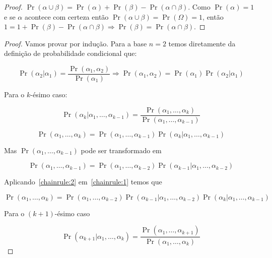 \documentclass{amsart}
\theoremstyle{plain}
\numberwithin{equation}{subsection}
\renewcommand{\implies}{\Rightarrow}
\begin{document}
\superset*
\begin{proof}
  $\Pr(\alpha\cup\beta)=\Pr(\alpha)+\Pr(\beta)-\Pr(\alpha\cap\beta)$. Como $\Pr(\alpha)=1$ e se
  $\alpha$ acontece com certeza então $\Pr(\alpha\cup\beta)=\Pr(\Omega)=1$, então $1=1+\Pr(\beta)-
  \Pr(\alpha\cap\beta)\implies\Pr(\beta)=\Pr(\alpha\cap\beta)$.
\end{proof}

\chainrule*
\begin{proof}
  Vamos provar por indução. Para a base $n=2$ temos diretamente da definição de probabilidade
  condicional que:

  \begin{equation*}
    \Pr(\alpha_2|\alpha_1)=\frac{\Pr(\alpha_1,\alpha_2)}{\Pr(\alpha_1)}\Rightarrow\Pr(\alpha_1
    ,\alpha_2)=\Pr(\alpha_1)\Pr(\alpha_2|\alpha_1)
  \end{equation*}

  Para o $k$-ésimo caso:

  \begin{equation*}
    \Pr(\alpha_k|\alpha_1,\ldots,\alpha_{k-1})=\frac{\Pr(\alpha_1,\ldots,\alpha_k)}
    {\Pr(\alpha_1,\ldots,\alpha_{k-1})}
  \end{equation*}

  \begin{equation}\label{chainrule:1}
    \Pr(\alpha_1,\ldots,\alpha_k)=\Pr(\alpha_1,\ldots,\alpha_{k-1})
      \Pr(\alpha_k|\alpha_1,\ldots,\alpha_{k-1})
  \end{equation}

  Mas $\Pr(\alpha_1,\ldots,\alpha_{k-1})$ pode ser transformado em

  \begin{equation}\label{chainrule:2}
    \Pr(\alpha_1,\ldots,\alpha_{k-1})=\Pr(\alpha_1,\ldots,\alpha_{k-2})
      \Pr(\alpha_{k-1}|\alpha_1,\ldots,\alpha_{k-2})
  \end{equation}

  Aplicando~\ref{chainrule:2} em~\ref{chainrule:1} temos que

  \begin{equation*}
    \Pr(\alpha_1,\ldots,\alpha_k)=\Pr(\alpha_1,\ldots,\alpha_{k-2})\Pr(\alpha_{k-1}|
      \alpha_1,\ldots,\alpha_{k-2})\Pr(\alpha_k|\alpha_1,\ldots,\alpha_{k-1})
  \end{equation*}

  Para o $(k+1)$-ésimo caso

  \begin{equation*}
    \Pr(\alpha_{k+1}|\alpha_1,\ldots,\alpha_k)=\frac{\Pr(\alpha_1,\ldots,\alpha_{k+1})}
      {\Pr(\alpha_1,\ldots,\alpha_k)}
  \end{equation*}


\end{proof}
\end{document}
